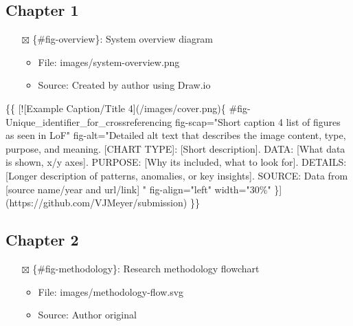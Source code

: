 \documentclass[
  11pt,
  letterpaper,
]{book}
\newenvironment{Shaded}{\begin{snugshade}}{\end{snugshade}}
\newcommand{\CommentTok}[1]{\textcolor[rgb]{0.37,0.37,0.37}{#1}}
\newcommand{\NormalTok}[1]{\textcolor[rgb]{0.00,0.23,0.31}{#1}}
\newcommand{\OtherTok}[1]{\textcolor[rgb]{0.00,0.23,0.31}{#1}}
\providecommand{\tightlist}{%
  \setlength{\itemsep}{0pt}\setlength{\parskip}{0pt}}
\begin{document}
\subsection{Chapter 1}\label{chapter-1}

\begin{itemize}
\tightlist
\item[$\boxtimes$]
  \{\#fig-overview\}: System overview diagram

  \begin{itemize}
  \tightlist
  \item
    File: images/system-overview.png
  \item
    Source: Created by author using Draw.io
  \end{itemize}
\end{itemize}

\begin{Shaded}
\begin{Highlighting}[]
\NormalTok{\{\{}
\CommentTok{[}\OtherTok{![Example Caption/Title 4}\CommentTok{](/images/cover.png)}\NormalTok{\{}
\NormalTok{    \#fig{-}Unique\_identifier\_for\_crossreferencing}
\NormalTok{    fig{-}scap="Short caption 4 list of figures as seen in LoF"}
\NormalTok{    fig{-}alt="Detailed alt text that describes the image content, type, purpose, and meaning.}
            \OtherTok{[CHART TYPE]: }\CommentTok{[}\OtherTok{Short description}\CommentTok{]}\NormalTok{.}
\NormalTok{                DATA: }\CommentTok{[}\OtherTok{What data is shown, x/y axes}\CommentTok{]}\NormalTok{.}
\NormalTok{                PURPOSE: }\CommentTok{[}\OtherTok{Why it\textquotesingle{}s included, what to look for}\CommentTok{]}\NormalTok{.}
\NormalTok{                DETAILS: }\CommentTok{[}\OtherTok{Longer description of patterns, anomalies, or key insights}\CommentTok{]}\NormalTok{.}
\NormalTok{                SOURCE: Data from }\CommentTok{[}\OtherTok{source name/year and url/link}\CommentTok{]}
\NormalTok{            "}
\NormalTok{    fig{-}align="left"}
\NormalTok{    width="30\%"}
\NormalTok{    \}](https://github.com/VJMeyer/submission)}
\NormalTok{\}\}}
\end{Highlighting}
\end{Shaded}

\subsection{Chapter 2}\label{chapter-2}

\begin{itemize}
\tightlist
\item[$\boxtimes$]
  \{\#fig-methodology\}: Research methodology flowchart

  \begin{itemize}
  \tightlist
  \item
    File: images/methodology-flow.svg
  \item
    Source: Author original
  \end{itemize}
\end{itemize}
\end{document}
